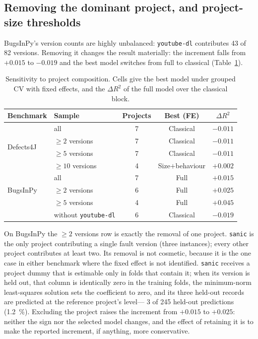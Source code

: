 \documentclass[preprint,12pt]{elsarticle}
\begin{document}
\subsection{Removing the dominant project, and project-size thresholds}

BugsInPy's version counts are highly unbalanced: \texttt{youtube-dl}
contributes 43 of 82 versions. Removing it changes the result materially:
the increment falls from $+0.015$ to $-0.019$ and the best model switches
from full to classical (Table~\ref{tab:subsets}).

\begin{table}[t]
\centering
\caption{Sensitivity to project composition. Cells give the best model
under grouped CV with fixed effects, and the $\Delta R^2$ of the full model
over the classical block.}
\label{tab:subsets}
\begin{tabular}{llccc}
\toprule
Benchmark & Sample & Projects & Best (FE) & $\Delta R^2$ \\
\midrule
\multirow{4}{*}{Defects4J}
 & all            & 7 & Classical & $-0.011$ \\
 & $\geq 2$ versions & 7 & Classical & $-0.011$ \\
 & $\geq 5$ versions & 7 & Classical & $-0.011$ \\
 & $\geq 10$ versions & 4 & Size$+$behaviour & $+0.002$ \\
\midrule
\multirow{3}{*}{BugsInPy}
 & all            & 7 & Full & $+0.015$ \\
 & $\geq 2$ versions & 6 & Full & $+0.025$ \\
 & $\geq 5$ versions & 4 & Full & $+0.045$ \\
 & without \texttt{youtube-dl} & 6 & Classical & $-0.019$ \\
\bottomrule
\end{tabular}
\end{table}

On BugsInPy the $\geq 2$ versions row is exactly the removal of one
project. \texttt{sanic} is the only project contributing a single fault
version (three instances); every other project contributes at least two. Its
removal is not cosmetic, because it is the one case in either benchmark
where the fixed effect is not identified. \texttt{sanic} receives a project
dummy that is estimable only in folds that contain it; when its version is
held out, that column is identically zero in the training folds, the
minimum-norm least-squares solution sets the coefficient to zero, and its
three held-out records are predicted at the reference project's level---%
\num{3} of \num{245} held-out predictions (\SI{1.2}{\percent}). Excluding the
project raises the increment from $+0.015$ to $+0.025$: neither the sign nor
the selected model changes, and the effect of retaining it is to make the
reported increment, if anything, more conservative.
\end{document}
